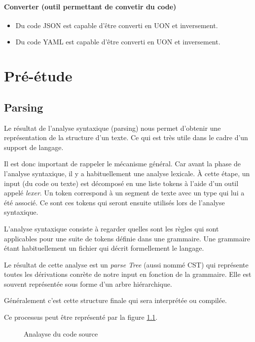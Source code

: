 \documentclass[
    iict, %
    il, %
]{heig-tb}
\begin{document}
\subsubsection*{Converter (outil permettant de convetir du code)}
\begin{itemize}
    \item Du code JSON est capable d'être converti en UON et inversement.
    \item Du code YAML est capable d'être converti en UON et inversement.
\end{itemize}

\chapter{Pré-étude}

\section{Parsing}\label{parsing}

Le résultat de l'analyse syntaxique (parsing) nous permet d'obtenir une représentation de la structure d'un texte. Ce qui est très utile dans le cadre d'un support de langage.

Il est donc important de rappeler le mécanisme général. Car avant la phase de l'analyse syntaxique, il y a habituellement une analyse lexicale.
À cette étape, un input (du code ou texte) est décomposé en une liste tokens à l'aide d'un outil appelé \emph{lexer}.
Un token correspond à un segment de texte avec un type qui lui a été associé.
Ce sont ces tokens qui seront ensuite utilisés lors de l'analyse syntaxique.

L'analyse syntaxique consiste à regarder quelles sont les règles qui sont applicables pour une suite de tokens définie dans une grammaire.
Une grammaire étant habituellement un fichier qui décrit formellement le langage.

Le résultat de cette analyse est un \emph{parse Tree} (aussi nommé CST) qui représente toutes les dérivations conrète de notre input en fonction de la grammaire.
Elle est souvent représentée sous forme d'un arbre hiérarchique.

Généralement c'est cette structure finale qui sera interprétée ou compilée.

Ce processus peut être représenté par la figure \ref{Analayse du code source}.

\begin{figure}[!h]
    \begin{center}
    \end{center}
    \caption[Analayse du code source]{\label{Analayse du code source} Analayse du code source}
\end{figure}
\end{document}
